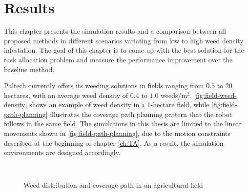 \chapter{Results}\label{ch:Results}
This chapter presents the simulation results and a comparison between all proposed methods in different scenarios variating from low to high weed density infestation. The goal of this chapter is to come up with the best solution for the task allocation problem and measure the performance improvement over the baseline method.

Paltech currently offers its weeding solutions in fields ranging from $0.5$ to $20$ hectares, with an average weed density of $0.4$ to $1.0$ weeds/m$^2$. \autoref{fig:field-weed-density} shows an example of weed density in a 1-hectare field, while \autoref{fig:field-path-planning} illustrates the coverage path planning pattern that the robot follows in the same field. The simulations in this thesis are limited to the linear movements shown in \ref{fig:field-path-planning}, due to the motion constraints described at the beginning of chapter \ref{ch:TA}. As a result, the simulation environments are designed accordingly.

\begin{figure}[htb]
    \myfloatalign
     \quad
     \\
    \caption{Weed distribution and coverage path in an agricultural field}\label{fig:usual-field-example}
\end{figure}

